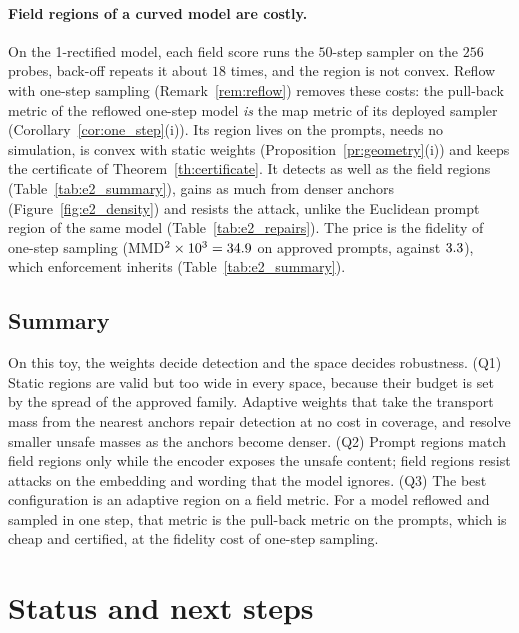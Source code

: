 \documentclass{article}
\theoremstyle{plain}
\theoremstyle{remark}
\begin{document}
\paragraph{Field regions of a curved model are costly.}
On the 1-rectified model, each field score runs the $50$-step sampler on the $256$ probes, back-off repeats it about $18$ times, and
the region is not convex. Reflow with one-step sampling (Remark~\ref{rem:reflow}) removes these costs: the pull-back metric of the
reflowed one-step model \emph{is} the map metric of its deployed sampler (Corollary~\ref{cor:one_step}(i)). Its region lives on the
prompts, needs no simulation, is convex with static weights (Proposition~\ref{pr:geometry}(i)) and keeps the certificate of
Theorem~\ref{th:certificate}. It detects as well as the field regions (Table~\ref{tab:e2_summary}), gains as much from denser anchors
(Figure~\ref{fig:e2_density}) and resists the attack, unlike the Euclidean prompt region of the same model (Table~\ref{tab:e2_repairs}).
The price is the fidelity of one-step sampling (MMD$^2\times10^3=34.9$ on approved prompts, against $3.3$), which
enforcement inherits (Table~\ref{tab:e2_summary}).
\FloatBarrier

\subsection{Summary}\label{sec:e2_summary}

On this toy, the weights decide detection and the space decides robustness.
(Q1) Static regions are valid but too wide in every space, because their budget is set by the spread of the approved family.
Adaptive weights that take the transport mass from the nearest anchors repair detection at no cost in coverage, and resolve smaller
unsafe masses as the anchors become denser.
(Q2) Prompt regions match field regions only while the encoder exposes the unsafe content; field regions resist attacks on the
embedding and wording that the model ignores.
(Q3) The best configuration is an adaptive region on a field metric. For a model reflowed and sampled in one step, that metric is
the pull-back metric on the prompts, which is cheap and certified, at the fidelity cost of one-step sampling.

\section{Status and next steps}\label{sec:next}
\end{document}

